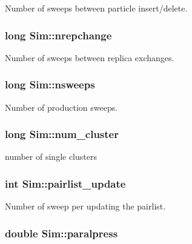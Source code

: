 Number of sweeps between particle insert/delete. 

\hypertarget{class_sim_a380b916e43b3eadc916f7695c9d60555}{
\subsubsection[{nrepchange}]{\setlength{\rightskip}{0pt plus 5cm}long Sim\+::nrepchange}}\label{class_sim_a380b916e43b3eadc916f7695c9d60555}


Number of sweeps between replica exchanges. 

\hypertarget{class_sim_a75f988cb78b30aeae402e4f63f28bfcc}{
\subsubsection[{nsweeps}]{\setlength{\rightskip}{0pt plus 5cm}long Sim\+::nsweeps}}\label{class_sim_a75f988cb78b30aeae402e4f63f28bfcc}


Number of production sweeps. 

\hypertarget{class_sim_abd86b808fdd2c02341e4dc8f7e877c12}{
\subsubsection[{num\+\_\+cluster}]{\setlength{\rightskip}{0pt plus 5cm}long Sim\+::num\+\_\+cluster}}\label{class_sim_abd86b808fdd2c02341e4dc8f7e877c12}


number of single clusters 

\hypertarget{class_sim_aea1de81852a1210e4b32bb887bbc52e1}{
\subsubsection[{pairlist\+\_\+update}]{\setlength{\rightskip}{0pt plus 5cm}int Sim\+::pairlist\+\_\+update}}\label{class_sim_aea1de81852a1210e4b32bb887bbc52e1}


Number of sweep per updating the pairlist. 

\hypertarget{class_sim_a2206aa7350fdbc1cbf14190fe01882a7}{
\subsubsection[{paralpress}]{\setlength{\rightskip}{0pt plus 5cm}double Sim\+::paralpress}}\label{class_sim_a2206aa7350fdbc1cbf14190fe01882a7}


